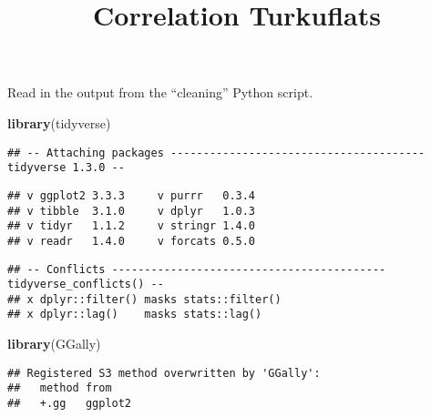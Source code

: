 \documentclass[
]{article}
\title{Correlation Turkuflats}
\author{}
\date{\vspace{-2.5em}}
\newenvironment{Shaded}{\begin{snugshade}}{\end{snugshade}}
\newcommand{\KeywordTok}[1]{\textcolor[rgb]{0.13,0.29,0.53}{\textbf{#1}}}
\newcommand{\NormalTok}[1]{#1}
\newcommand{\OperatorTok}[1]{\textcolor[rgb]{0.81,0.36,0.00}{\textbf{#1}}}
\newcommand{\StringTok}[1]{\textcolor[rgb]{0.31,0.60,0.02}{#1}}
\begin{document}
\maketitle

Read in the output from the ``cleaning'' Python script.

\begin{Shaded}
\begin{Highlighting}[]
\KeywordTok{library}\NormalTok{(tidyverse)}
\end{Highlighting}
\end{Shaded}

\begin{verbatim}
## -- Attaching packages --------------------------------------- tidyverse 1.3.0 --
\end{verbatim}

\begin{verbatim}
## v ggplot2 3.3.3     v purrr   0.3.4
## v tibble  3.1.0     v dplyr   1.0.3
## v tidyr   1.1.2     v stringr 1.4.0
## v readr   1.4.0     v forcats 0.5.0
\end{verbatim}

\begin{verbatim}
## -- Conflicts ------------------------------------------ tidyverse_conflicts() --
## x dplyr::filter() masks stats::filter()
## x dplyr::lag()    masks stats::lag()
\end{verbatim}

\begin{Shaded}
\begin{Highlighting}[]
\KeywordTok{library}\NormalTok{(GGally)}
\end{Highlighting}
\end{Shaded}

\begin{verbatim}
## Registered S3 method overwritten by 'GGally':
##   method from   
##   +.gg   ggplot2
\end{verbatim}

\begin{Shaded}
\end{Shaded}
\end{document}
